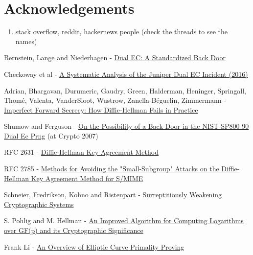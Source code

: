 \documentclass[a4paper,11pt,twocolumn]{article}
\begin{document}
\newpage

\section*{Acknowledgements}

\begin{enumerate}
    \item stack overflow, reddit, hackernews people (check the threads to see the names)
\end{enumerate}

\newpage

\begin{thebibliography}{1}

 Bernstein, Lange and Niederhagen - \href{https://eprint.iacr.org/2015/767.pdf}{Dual EC: A Standardized Back Door}

 Checkoway et al - \href{http://eprint.iacr.org/2016/376}{A Systematic Analysis of the Juniper Dual EC Incident (2016)}

 Adrian, Bhargavan, Durumeric, Gaudry, Green, Halderman, Heninger, Springall, Thomé, Valenta,  VanderSloot, Wustrow, Zanella-Béguelin, Zimmermann -  \href{https://weakdh.org/imperfect-forward-secrecy-ccs15.pdf}{Imperfect Forward Secrecy: How Diffie-Hellman Fails in Practice}

 Shumow and Ferguson - \href{http://rump2007.cr.yp.to/15-shumow.pdf}{On the Possibility of a Back Door in the NIST SP800-90 Dual Ec Prng} (at Crypto 2007)

 RFC 2631 - \href{https://tools.ietf.org/html/rfc2631}{Diffie-Hellman Key Agreement Method}

 RFC 2785 - \href{https://tools.ietf.org/html/rfc2785}{Methods for Avoiding the "Small-Subgroup" Attacks on the Diffie-Hellman Key Agreement Method for S/MIME}

 Schneier, Fredrikson, Kohno and Ristenpart - \href{https://eprint.iacr.org/2015/097.pdf}{Surreptitiously Weakening Cryptographic Systems}

 S. Pohlig and M. Hellman - \href{http://www-ee.stanford.edu/~hellman/publications/28.pdf}{An Improved Algorithm for Computing Logarithms over GF(p) and its Cryptographic Significance}

 Frank Li - \href{http://theory.stanford.edu/~dfreeman/cs259c-f11/finalpapers/primalityproving.pdf}{An Overview of Elliptic Curve Primality Proving}


\end{thebibliography}
\end{document}
